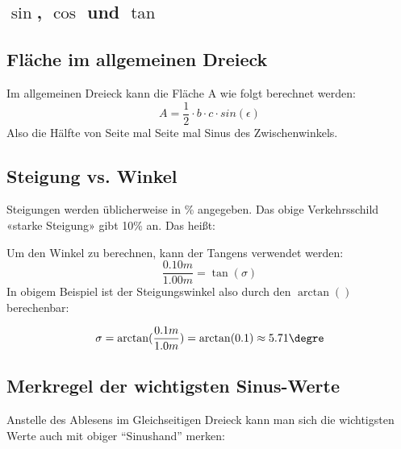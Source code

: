 \subsection{$\sin{}$, $\cos{}$ und $\tan{}$}


\newpage
\subsection{Fläche im allgemeinen Dreieck}


Im allgemeinen Dreieck kann die Fläche A wie folgt berechnet werden:
$$A = \frac{1}{2}\cdot{}b\cdot{}c\cdot{}sin(\epsilon)$$
Also die Hälfte von Seite mal Seite mal Sinus des Zwischenwinkels.
\newpage


\subsection{Steigung vs. Winkel}


Steigungen werden üblicherweise in \% angegeben. Das obige
Verkehrsschild «starke Steigung» gibt 10\% an. Das heißt:


Um den Winkel zu berechnen, kann der Tangens verwendet werden:
$$\frac{0.10m}{1.00m} = \tan(\sigma)$$
In obigem Beispiel ist der Steigungswinkel also durch den $\arctan()$
berechenbar:

$$\sigma = \arctan(\frac{0.1m}{1.0m}) = \arctan(0.1) \approx 5.71\degre$$
\newpage
\subsection{Merkregel der wichtigsten Sinus-Werte}
Anstelle des Ablesens im Gleichseitigen Dreieck kann man sich die wichtigsten Werte
auch mit obiger ``Sinushand'' merken:

